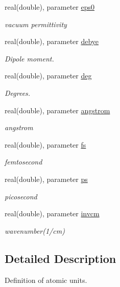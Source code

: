 \begin{DoxyCompactItemize}
real(double), parameter \hyperlink{classatomicunits_a45821c6127c356d71ba94bf34b962653}{eps0}
\begin{DoxyCompactList}\small\item\em vacuum permittivity \end{DoxyCompactList}\item 
real(double), parameter \hyperlink{classatomicunits_af82c72bfababde1e5da6ac04a43b8570}{debye}
\begin{DoxyCompactList}\small\item\em Dipole moment. \end{DoxyCompactList}\item 
real(double), parameter \hyperlink{classatomicunits_af9552fc54f3050b11cce6152261c2bf2}{deg}
\begin{DoxyCompactList}\small\item\em Degrees. \end{DoxyCompactList}\item 
real(double), parameter \hyperlink{classatomicunits_a618f9dcd7de9b9ddb53af5bd4f1095c6}{angstrom}
\begin{DoxyCompactList}\small\item\em angstrom \end{DoxyCompactList}\item 
real(double), parameter \hyperlink{classatomicunits_a51f9c61f64f3aec674dd6dbb342e733d}{fs}
\begin{DoxyCompactList}\small\item\em femtosecond \end{DoxyCompactList}\item 
real(double), parameter \hyperlink{classatomicunits_af5dac3bb123ac05a538d6ebd2373eb3b}{ps}
\begin{DoxyCompactList}\small\item\em picosecond \end{DoxyCompactList}\item 
real(double), parameter \hyperlink{classatomicunits_a1741cd0f8cdd696033c1c18531740795}{invcm}
\begin{DoxyCompactList}\small\item\em wavenumber(1/cm) \end{DoxyCompactList}\end{DoxyCompactItemize}


\subsection{Detailed Description}
Definition of atomic units. 

